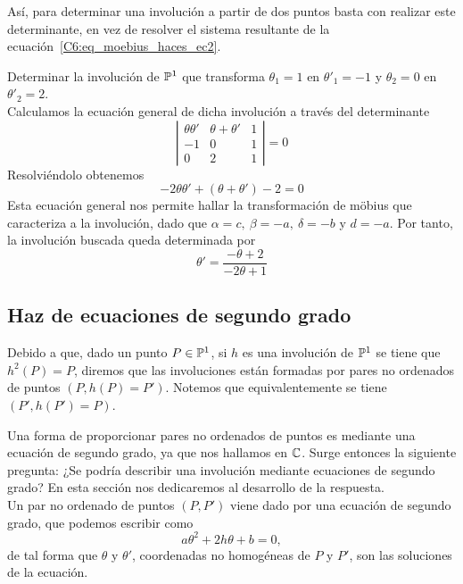 Así, para determinar una involución a partir de dos puntos basta con realizar este determinante, en vez de resolver el sistema resultante de la ecuación~\eqref{C6:eq_moebius_haces_ec2}.
\begin{exa}
	Determinar la involución de $\mathbb{P}^1$ que transforma $\theta_1=1$ en $\theta'_1=-1$ y $\theta_2=0$ en $\theta'_2=2$.\\
	
	Calculamos la ecuación general de dicha involución a través del determinante
	\begin{equation*}
		\left| \begin{array}{ccc}
			\theta\theta'&\theta+\theta'&1\\
			-1&0&1\\
			0&2&1
		\end{array}\right| =0
	\end{equation*}
	Resolviéndolo obtenemos
	\begin{equation*}
		-2\theta\theta'+(\theta+\theta')-2=0
	\end{equation*}
	Esta ecuación general nos permite hallar la transformación de möbius que caracteriza a la involución, dado que $\alpha=c, \ \beta=-a, \ \delta=-b$ y $d=-a$. Por tanto, la involución buscada queda determinada por
	\begin{equation*}
		\theta'=\frac{-\theta+2}{-2\theta+1}
	\end{equation*}
\end{exa}

\subsection{Haz de ecuaciones de segundo grado}
Debido a que, dado un punto $P\in\mathbb{P}^1$, si $h$ es una involución de $\mathbb{P}^1$ se tiene que $h^2(P)=P$, diremos que las involuciones están formadas por pares no ordenados de puntos $(P,h(P)=P')$. Notemos que equivalentemente se tiene $(P',h(P')=P)$.

Una forma de proporcionar pares no ordenados de puntos es mediante una ecuación de segundo grado, ya que nos hallamos en $\mathbb{C}$. Surge entonces la siguiente pregunta: ¿Se podría describir una involución mediante ecuaciones de segundo grado? En esta sección nos dedicaremos al desarrollo de la respuesta.\\

Un par no ordenado de puntos $(P,P')$ viene dado por una ecuación de segundo grado, que podemos escribir como
\begin{equation*}
	a\theta^2+2h\theta+b=0,
\end{equation*}
de tal forma que $\theta$ y $\theta'$, coordenadas no homogéneas de $P$ y $P'$, son las soluciones de la ecuación.

